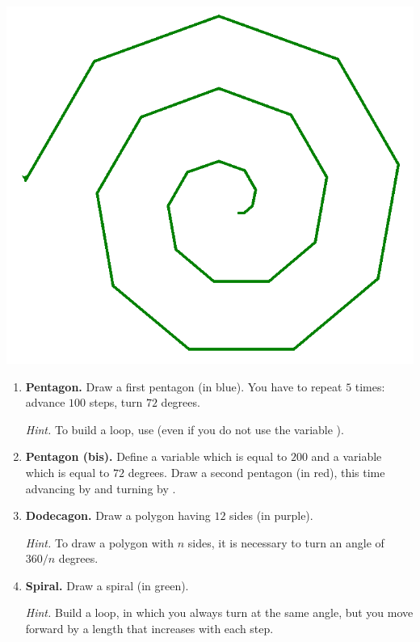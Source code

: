 \documentclass[11pt,class=report,crop=false]{standalone}
\begin{document}
\begin{activite}[Figures]
\begin{center}
\includegraphics[scale=\myscale,scale=0.2]{screen-turtle-2d}
\end{center}

\begin{enumerate}
  \item \textbf{Pentagon.} Draw a first pentagon (in blue). You have to repeat $5$ times: advance $100$ steps, turn $72$ degrees.
  
  \emph{Hint.} To build a loop, use  
   (even if you do not use the variable ).
  
  \item \textbf{Pentagon (bis).} Define a variable  which is equal to $200$ and a variable  which is equal to $72$ degrees. Draw a second pentagon (in red), this time advancing by  and turning by .
  
  \item \textbf{Dodecagon.} Draw a polygon having $12$ sides (in purple). 
  
  \emph{Hint.} To draw a polygon with $n$ sides, it is necessary to turn an angle of $360/n$ degrees.
  
  \item \textbf{Spiral.} Draw a spiral (in green).
  
  \emph{Hint.} Build a loop, in which you always turn at the same angle, but you move forward by a length that increases with each step.
  
\end{enumerate}
  
\end{activite}
\end{document}

